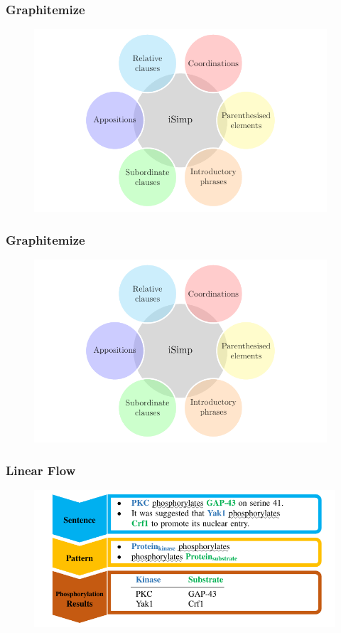 \documentclass{beamer}
\begin{document}
\begin{frame}[fragile] 
  \frametitle{Graphitemize}
  \begin{figure}
    \includegraphics[height=6.8cm,page=1]{bubble.pdf}
  \end{figure}
\end{frame}

\begin{frame}
  \frametitle{Graphitemize}
  \begin{figure}
    \includegraphics[height=6.8cm,page=2]{bubble.pdf}
  \end{figure}
\end{frame}

\begin{frame}[fragile] 
  \frametitle{Linear Flow}
  \begin{figure}
    \includegraphics[width=\textwidth,page=1]{linear.pdf}
  \end{figure}
\end{frame}
\end{document}

